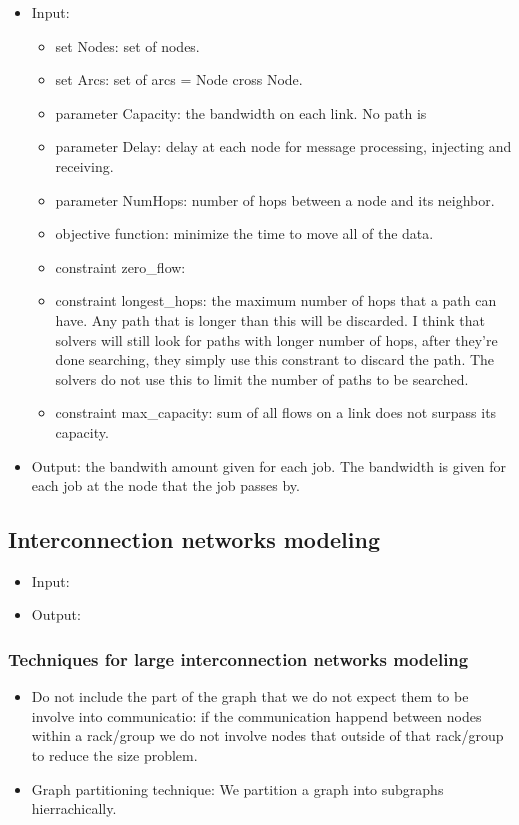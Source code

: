 \documentclass[letter]{article}
\begin{document}
\begin{itemize}
\item Input:
\begin{itemize}
\item set Nodes: set of nodes.
\item set Arcs: set of arcs = Node cross Node.
\item parameter Capacity: the bandwidth on each link. No path is 
\item parameter Delay: delay at each node for message processing, injecting and receiving.
\item parameter NumHops: number of hops between a node and its neighbor.
\item objective function: minimize the time to move all of the data.
\item constraint zero\_flow: 
\item constraint longest\_hops: the maximum number of hops that a path can have. Any path that is longer than this will be discarded. I think that solvers will still look for paths with longer number of hops, after they're done searching, they simply use this constrant to discard the path. The solvers do not use this to limit the number of paths to be searched.
\item constraint max\_capacity: sum of all flows on a link does not surpass its capacity.
\end{itemize}
\item Output: the bandwith amount given for each job. The bandwidth is given for each job at the node that the job passes by. 
\end{itemize}

\subsection {Interconnection networks modeling}
\begin{itemize}
\item Input:
\item Output:
\end{itemize}

\subsubsection{Techniques for large interconnection networks modeling}
\begin{itemize}
\item Do not include the part of the graph that we do not expect them to be involve into communicatio: if the communication happend between nodes within a rack/group we do not involve nodes that outside of that rack/group to reduce the size problem.
\item Graph partitioning technique: We partition a graph into subgraphs hierrachically.
\end{itemize}
\end{document}
